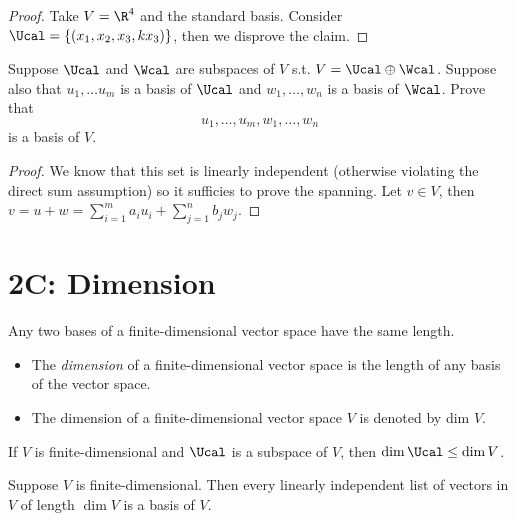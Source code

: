 \documentclass{extarticle}
\begin{document}
\begin{proof}
Take \(V = \R^4\) and the standard basis. Consider \(\Ucal = \{(x_1, x_2, x_3, kx_3)\}\), then 
we disprove the claim. 
\end{proof}

\begin{problem}{10}
    Suppose \(\Ucal\) and \(\Wcal\) are subspaces of \(V\) s.t. \(V = \Ucal \oplus \Wcal\). Suppose 
    also that \(u_1, \ldots u_m\) is a basis of \(\Ucal\) and \(w_1, \ldots, w_n\) is a basis of 
    \(\Wcal\). Prove that 
    \[u_1, \ldots, u_m, w_1, \ldots, w_n\]
    is a basis of \(V\). 
\end{problem}

\begin{proof}
We know 
that this set is linearly independent (otherwise violating the direct sum assumption) 
so it sufficies to prove the spanning. Let \(v \in V\),
then \(v = u + w = \sum_{i=1}^m a_i u_i + \sum_{j=1}^n b_j w_j\). 
\end{proof}

\newpage 

\section*{2C: Dimension}

\begin{lemma}
    Any two bases of a finite-dimensional vector space have the same length. 
\end{lemma}

\begin{definition}[dimension]
    \begin{itemize}
        \item The \emph{dimension} of a finite-dimensional vector space is the length of 
        any basis of the vector space. 
        \item The dimension of a finite-dimensional vector space \(V\) is denoted by dim \(V\).
    \end{itemize}
\end{definition}

\begin{corollary}
    If \(V\) is finite-dimensional and \(\Ucal\) is a subspace of \(V\), then 
    \(\dim \Ucal \leq \dim V\). 
\end{corollary}

\begin{corollary}
    Suppose \(V\) is finite-dimensional. Then every linearly independent list of vectors 
    in \(V\) of length \(\dim V\) is a basis of \(V\). 
\end{corollary}
\end{document}
